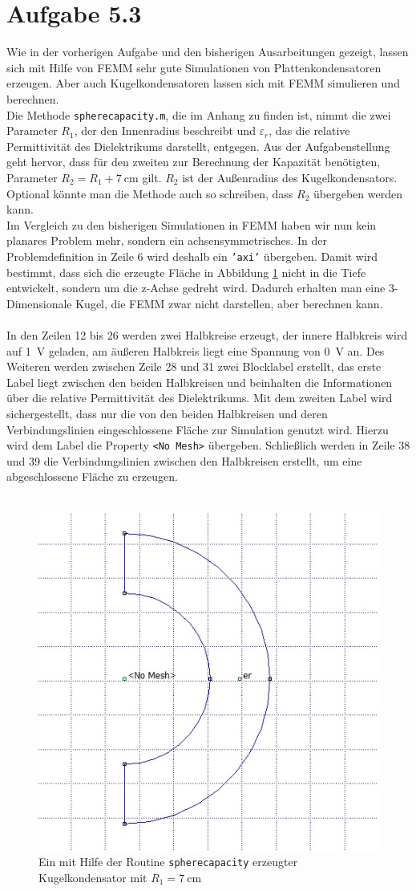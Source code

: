 \section{Aufgabe 5.3}
Wie in der vorherigen Aufgabe und den bisherigen Ausarbeitungen gezeigt, lassen sich mit Hilfe von FEMM sehr gute Simulationen von Plattenkondensatoren erzeugen. Aber auch Kugelkondensatoren lassen sich mit FEMM simulieren und berechnen. \\
Die Methode \texttt{spherecapacity.m}, die im Anhang zu finden ist, nimmt die zwei Parameter $R_1$, der den Innenradius beschreibt und $\varepsilon_r$, das die relative Permittivität des Dielektrikums darstellt, entgegen. Aus der Aufgabenstellung geht hervor, dass für den zweiten zur Berechnung der Kapazität benötigten, Parameter $R_2 = R_1 + \SI{7}{\centi\meter}$ gilt. $R_2$ ist der Außenradius des Kugelkondensators. Optional könnte man die Methode auch so schreiben, dass $R_2$ übergeben werden kann.\\
Im Vergleich zu den bisherigen Simulationen in FEMM haben wir nun kein planares Problem mehr, sondern ein achsensymmetrisches. In der Problemdefinition in Zeile 6 wird deshalb ein \texttt{'axi'} übergeben. Damit wird bestimmt, dass sich die erzeugte Fläche in Abbildung \ref{fig:KK} nicht in die Tiefe entwickelt, sondern um die z-Achse gedreht wird. Dadurch erhalten man eine 3-Dimensionale Kugel, die FEMM zwar nicht darstellen, aber berechnen kann.\\ \\
In den Zeilen 12 bis 26 werden zwei Halbkreise erzeugt, der innere Halbkreis wird auf \SI{1}{\volt} geladen, am äußeren Halbkreis liegt eine Spannung von \SI{0}{\volt} an. Des Weiteren werden zwischen Zeile 28 und 31 zwei Blocklabel erstellt, das erste Label liegt zwischen den beiden Halbkreisen und beinhalten die Informationen über die relative Permittivität des Dielektrikums. Mit dem zweiten Label wird sichergestellt, dass nur die von den beiden Halbkreisen und deren Verbindungslinien eingeschlossene Fläche zur Simulation genutzt wird. Hierzu wird dem Label die Property \texttt{<No Mesh>} übergeben. Schließlich werden in Zeile 38 und 39 die Verbindungslinien zwischen den Halbkreisen erstellt, um eine abgeschlossene Fläche zu erzeugen. \\ \\
\begin{figure}[h]
	\centering
	\includegraphics[width=.45\textwidth]{data/Kugelkondensator}
	\caption{Ein mit Hilfe der Routine \texttt{spherecapacity} erzeugter Kugelkondensator mit $R_1 = \SI{7}{\centi\meter}$ }
	\label{fig:KK}
\end{figure}

